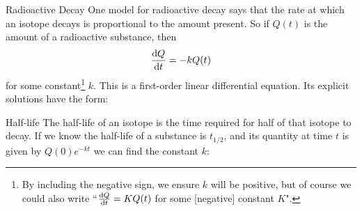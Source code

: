 \begin{frame}[t]{Radioactive Decay}
One model for radioactive decay says that the rate at which an isotope decays is proportional to the amount present. So if $Q(t)$ is the amount of a radioactive substance, then
\[\frac{\text{d}Q}{\text{d}t}=-kQ(t)\]
for some constant\footnote{By including the negative sign, we ensure $k$ will be positive, but of course we could also write ``$\frac{\text{d}Q}{\text{d}t}=KQ(t)$ for some [negative] constant $K$".} $k$. 
\vfill
This is a first-order linear differential equation. Its explicit solutions have the form:
\end{frame}
\begin{frame}[t]{Half-life}
The \alert{half-life} of an isotope is the time required for half of that isotope to decay. If we know the half-life of a substance is $t_{1/2}$, and its quantity at time $t$ is given by $Q(0)e^ {-kt}$ we can find the constant $k$:

	\vfill\color{black}
	

\end{frame}
